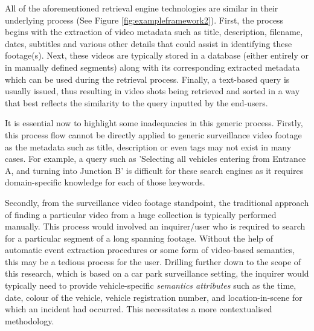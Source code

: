 All of the aforementioned retrieval engine technologies are similar
in their underlying process (See Figure \ref{fig:exampleframework2}). First, the process begins with the extraction of video metadata such as title, description, filename, dates, subtitles and various other details that could assist in identifying these footage(s). Next, these videos are typically stored in a database (either entirely or in manually defined segments) along with its corresponding extracted metadata which can be used during the retrieval process. Finally, a text-based query is usually issued, thus resulting in video shots being retrieved and sorted in a way that best
reflects the similarity to
the query inputted by the end-users.

It is essential now to highlight some inadequacies in this generic process. Firstly, this process flow cannot be directly applied to generic surveillance video footage as the metadata such as title, description or even tags may not exist in many cases.
For example, a query such as 'Selecting all vehicles entering from Entrance A, and turning into Junction B'
is difficult for these search engines as it requires domain-specific knowledge
for each of those keywords.

Secondly, from the surveillance video footage standpoint, the traditional approach of finding a particular video from a huge collection is typically performed manually. This process would involved an inquirer/user who is required to search for a particular segment of a long spanning footage. Without the help of automatic event extraction procedures or some form of video-based semantics, this may be a tedious process for the user.
Drilling further down to the scope of this research, which is based on a car
park surveillance setting, the inquirer would typically need to provide
vehicle-specific \textit{semantics attributes} such as the time, date, colour of the vehicle, vehicle registration number, and location-in-scene for which an incident had occurred. This necessitates a more contextualised methodology. %

